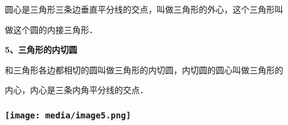 \documentclass[a4paper,11pt,UTF8]{ctexart}
\begin{document}
圆心是三角形三条边垂直平分线的交点，叫做三角形的外心，这个三角形叫

做这个圆的内接三角形．

\textbf{5、三角形的内切圆}

和三角形各边都相切的圆叫做三角形的内切圆，内切圆的圆心叫做三角形的

内心，内心是三条内角平分线的交点．

\hypertarget{ux5b66ux79d1ux7f51www.zxxk.com--ux6559ux80b2ux8d44ux6e90ux95e8ux6237ux63d0ux4f9bux8bd5ux9898ux8bd5ux5377ux6559ux6848ux8bfeux4ef6ux6559ux5b66ux8bbaux6587ux7d20ux6750ux7b49ux5404ux7c7bux6559ux5b66ux8d44ux6e90ux5e93ux4e0bux8f7dux8fd8ux6709ux5927ux91cfux4e30ux5bccux7684ux6559ux5b66ux8d44ux8baf-20}{%
\subsubsection{\texorpdfstring{\protect\texttt{[image: media/image5.png]}}{学科网(www.zxxk.com)-\/-教育资源门户，提供试题试卷、教案、课件、教学论文、素材等各类教学资源库下载，还有大量丰富的教学资讯！}}\label{ux5b66ux79d1ux7f51www.zxxk.com--ux6559ux80b2ux8d44ux6e90ux95e8ux6237ux63d0ux4f9bux8bd5ux9898ux8bd5ux5377ux6559ux6848ux8bfeux4ef6ux6559ux5b66ux8bbaux6587ux7d20ux6750ux7b49ux5404ux7c7bux6559ux5b66ux8d44ux6e90ux5e93ux4e0bux8f7dux8fd8ux6709ux5927ux91cfux4e30ux5bccux7684ux6559ux5b66ux8d44ux8baf-20}}
\end{document}
